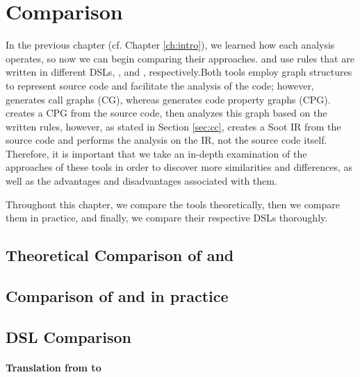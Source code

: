\chapter{Comparison}
\label{ch:compare}
In the previous chapter (cf. Chapter \ref{ch:intro}), we learned how each analysis operates, so now we can begin comparing their approaches.\codyze{} and \cognicryptsast{} use rules that are written in different DSLs, \MARK, and \crysl, respectively.Both tools employ graph structures to represent source code and facilitate the analysis of the code; however, \cognicryptsast{} generates call graphs (CG), whereas \codyze{} generates code property graphs (CPG). \codyze{} creates a CPG from the source code, then analyzes this graph based on the written rules, however, as stated in Section \ref{sec:cc}, \cognicryptsast{} creates a Soot IR from the source code and performs the analysis on the IR, not the source code itself. Therefore, it is important that we take an in-depth examination of the approaches of these tools in order to discover more similarities and differences, as well as the advantages and disadvantages associated with them.

Throughout this chapter, we compare the tools theoretically, then we compare them in practice, and finally, we compare their respective DSLs thoroughly.

\section{Theoretical Comparison of \cognicryptsast{} and \codyze{}}
\label{sec:theotools}


\section{Comparison of \cognicryptsast{} and \codyze{} in practice}
\label{sec:practical}


\section{DSL Comparison}
\label{sec:dsl}


\subsubsection{Translation from \crysl{} to \MARK{}}

\label{sec:marktocrysl}


